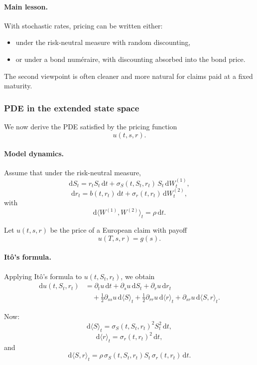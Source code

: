 \documentclass[11pt]{article}
\theoremstyle{plain}
\theoremstyle{definition}
\theoremstyle{remark}
\begin{document}
\paragraph{Main lesson.}
With stochastic rates, pricing can be written either:
\begin{itemize}[leftmargin=1.4em]
    \item under the risk-neutral measure with random discounting,
    \item or under a bond numéraire, with discounting absorbed into the
    bond price.
\end{itemize}

The second viewpoint is often cleaner and more natural for claims paid
at a fixed maturity.

\subsubsection{PDE in the extended state space}

We now derive the PDE satisfied by the pricing function
\[
u(t,s,r).
\]

\paragraph{Model dynamics.}
Assume that under the risk-neutral measure,
\[
\mathrm{d}S_t
=
r_tS_t\,\mathrm{d}t
+
\sigma_S(t,S_t,r_t)\,S_t\,\mathrm{d}W_t^{(1)},
\]
\[
\mathrm{d}r_t
=
b(t,r_t)\,\mathrm{d}t
+
\sigma_r(t,r_t)\,\mathrm{d}W_t^{(2)},
\]
with
\[
\mathrm{d}\langle W^{(1)},W^{(2)}\rangle_t=\rho\,\mathrm{d}t.
\]

Let \(u(t,s,r)\) be the price of a European claim with payoff
\[
u(T,s,r)=g(s).
\]

\paragraph{It\^o's formula.}
Applying It\^o's formula to \(u(t,S_t,r_t)\), we obtain
\begin{align*}
\mathrm{d}u(t,S_t,r_t)
&=
\partial_t u\,\mathrm{d}t
+
\partial_s u\,\mathrm{d}S_t
+
\partial_r u\,\mathrm{d}r_t
\\
&\quad
+
\frac12 \partial_{ss}u\,\mathrm{d}\langle S\rangle_t
+
\frac12 \partial_{rr}u\,\mathrm{d}\langle r\rangle_t
+
\partial_{sr}u\,\mathrm{d}\langle S,r\rangle_t.
\end{align*}

Now:
\[
\mathrm{d}\langle S\rangle_t
=
\sigma_S(t,S_t,r_t)^2 S_t^2\,\mathrm{d}t,
\]
\[
\mathrm{d}\langle r\rangle_t
=
\sigma_r(t,r_t)^2\,\mathrm{d}t,
\]
and
\[
\mathrm{d}\langle S,r\rangle_t
=
\rho\,\sigma_S(t,S_t,r_t)S_t\,\sigma_r(t,r_t)\,\mathrm{d}t.
\]
\end{document}
